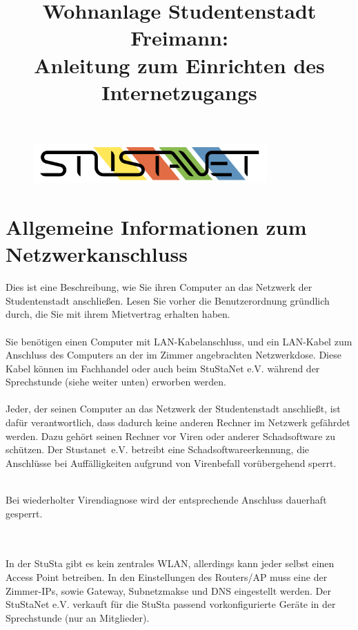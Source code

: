 \documentclass[a4paper,12pt]{scrartcl}
\title{Wohnanlage Studentenstadt Freimann:\\
       Anleitung zum Einrichten des Internetzugangs}
\begin{document}
\maketitle

\begin{figure}[t!]
   \centering
   \vspace{-20pt}
   \includegraphics[width=0.8\textwidth,keepaspectratio]{Bilder/StuStaNet_Logo}
   \vspace{-40pt}
\end{figure}

\section*{Allgemeine Informationen zum Netzwerkanschluss}

Dies ist eine Beschreibung, wie Sie ihren Computer an das Netzwerk der Studentenstadt anschließen. Lesen Sie vorher die Benutzerordnung gründlich durch, die Sie mit ihrem Mietvertrag erhalten haben.
\\
\\
Sie benötigen einen Computer mit LAN-Kabelanschluss, und ein LAN-Kabel zum Anschluss des Computers an der im Zimmer angebrachten Netzwerkdose. Diese Kabel können im Fachhandel oder auch beim StuStaNet e.V. während der Sprechstunde (siehe weiter unten) erworben werden.
\\
\\
Jeder, der seinen Computer an das Netzwerk der Studentenstadt anschließt, ist dafür verantwortlich, dass dadurch keine anderen Rechner im Netzwerk gefährdet werden. Dazu gehört seinen Rechner vor Viren oder anderer Schadsoftware zu schützen.
Der Stustanet~e.V. betreibt eine Schadsoftwareerkennung, die Anschlüsse bei Auffälligkeiten aufgrund von Virenbefall vorübergehend sperrt.
\\
\begin{bfseries}
	\\Bei wiederholter Virendiagnose wird der entsprechende Anschluss dauerhaft gesperrt.
\end{bfseries}
\\
\\
In der StuSta gibt es kein zentrales WLAN, allerdings kann jeder selbst einen Access Point betreiben. In den Einstellungen des Routers/AP muss eine der Zimmer-IPs, sowie Gateway, Subnetzmakse und DNS eingestellt werden. Der StuStaNet e.V. verkauft für die StuSta passend vorkonfigurierte Geräte in der Sprechstunde (nur an Mitglieder).
\end{document}
